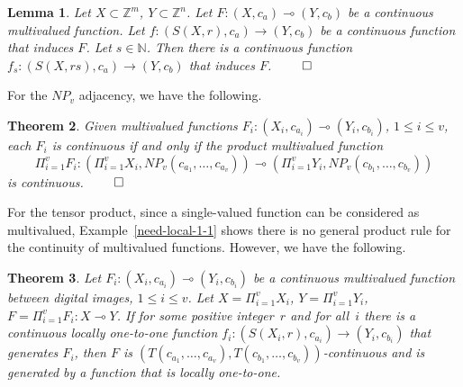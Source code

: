 \documentclass{article}
\theoremstyle{plain}
\newtheorem{thm}{Theorem}
\newtheorem{lem}[thm]{Lemma}
\theoremstyle{definition}
\numberwithin{thm}{section}
\def\N{{\mathbb N}}
\def\Z{{\mathbb Z}}
\begin{document}
\begin{lem}
\label{gcm-subdiv}
\rm{\cite{Boxer16a}}
Let $X \subset \Z^m$, $Y \subset \Z^n$.
Let $F: (X,c_a) \multimap (Y,c_b)$ be a
continuous multivalued function. Let
$f: (S(X,r),c_a) \to (Y,c_b)$ be a continuous function that
induces $F$. Let $s \in \N$. Then there is a
continuous function
$f_s: (S(X,rs),c_a) \to (Y,c_b)$ that induces $F$. $\qed$
\end{lem}

For the $NP_v$ adjacency, we have
the following.

\begin{thm}
\label{multi-prod-thm}
\rm{\cite{Boxer16a}}
Given multivalued functions
$F_i: (X_i,c_{a_i}) \multimap (Y_i,c_{b_i})$,
$1 \leq i \leq v$, each
$F_i$ is continuous if and only if the product multivalued function
\[ \Pi_{i=1}^v F_i: (\Pi_{i=1}^v X_i, NP_v(c_{a_1},\ldots, c_{a_v})) \multimap (\Pi_{i=1}^v Y_i, NP_v(c_{b_1}, \ldots, c_{b_v})) \]
is continuous. $\qed$
\end{thm}

For the tensor product, since a
single-valued function can be considered as multivalued,
Example~\ref{need-local-1-1} shows there is no general product rule for the continuity
of multivalued functions. 
However, we have the following.

\begin{thm}
\label{tensor-prod-multi-cont}
Let $F_i: (X_i,c_{a_i}) \multimap (Y_i,c_{b_i})$ be a continuous
multivalued function between digital images, $1 \le i \le v$.
Let $X=\Pi_{i=1}^v X_i$,
$Y=\Pi_{i=1}^v Y_i$,
$F=\Pi_{i=1}^v F_i: X \multimap Y$.
If for some positive integer~$r$ and for all~$i$ there is a continuous locally one-to-one
function $f_i: (S(X_i,r),c_{a_i}) \to (Y_i,c_{b_i})$ that generates
$F_i$, then $F$ is
$(T(c_{a_1},\ldots,c_{a_v}),T(c_{b_1},\ldots,c_{b_v}))$-continuous and is generated by a function
that is locally one-to-one.
\end{thm}
\end{document}
